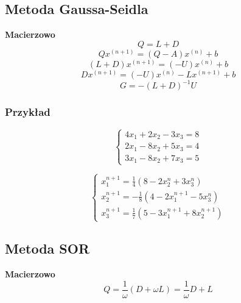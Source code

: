 \documentclass[../mn-notatki.tex]{subfiles}
\begin{document}
\subsection{Metoda Gaussa-Seidla}
\begin{tcolorbox}
\textbf{Macierzowo}
\[
Q = L + D
\]
\[
Qx^{(n+1)} = (Q - A)x^{(n)} + b
\]
\[
(L+D)x^{(n+1)} = (-U)x^{(n)} + b
\]
\[
Dx^{(n+1)} = (-U)x^{(n)} - Lx^{(n+1)} + b
\]
\[
G = -(L+D)^{-1} U
\]
\end{tcolorbox}

\subsubsection{Przykład}
\begin{table}[!htb]
    \begin{minipage}{.5\linewidth}
\[
\begin{cases}
4x_1 + 2x_2 - 3x_3 = 8\\
2x_1  - 8x_2 + 5x_3 = 4\\
3x_1 - 8x_2 + 7x_3 = 5
\end{cases}
\]
    \end{minipage}%
    \begin{minipage}{.5\linewidth}
\[
\begin{cases}
x_1^{n+1} =  \frac{1}{4} ( 8 - 2x_2^n + 3x_3^n  ) \\
x_2^{n+1} = -\frac{1}{8} ( 4 - 2x_1^{n+1} - 5x_3^n  ) \\
x_3^{n+1} =  \frac{1}{7} ( 5 - 3x_1^{n+1} + 8x_2^{n+1}  )
\end{cases}
\]
    \end{minipage}%
\end{table}

\subsection{Metoda SOR}
\begin{tcolorbox}
\textbf{Macierzowo}
\[
Q = \frac{1}{\omega} (D + \omega L) = \frac{1}{\omega} D + L
\]
\end{tcolorbox}
\end{document}
